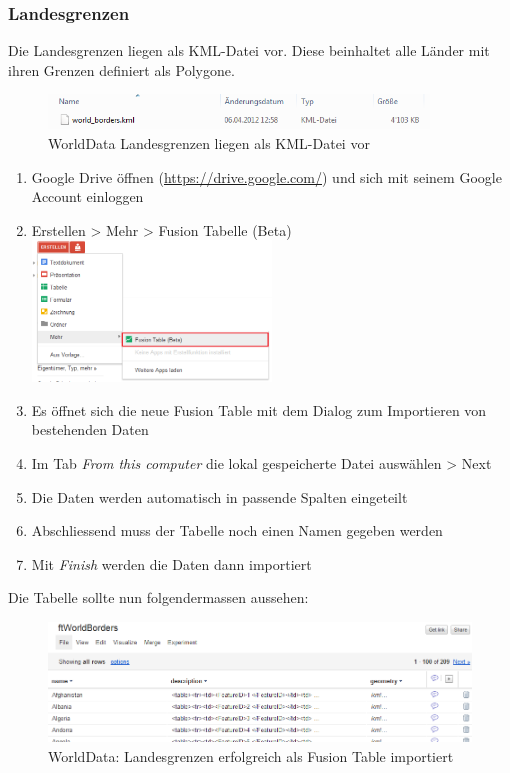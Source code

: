 \subsubsection{Landesgrenzen}
\label{landesgrenzen}
Die Landesgrenzen liegen als KML-Datei vor. Diese beinhaltet alle Länder mit ihren Grenzen definiert als Polygone.

\begin{figure}[!h]
	\centering
	\includegraphics[width=0.9\textwidth]{images/usecase1-worlddata/documentation/worlddata-worldborders_kml}
	\caption{WorldData Landesgrenzen liegen als KML-Datei vor}
	\label{worlddata-worldborders_kml}
\end{figure}

\begin{enumerate}
\item Google Drive öffnen (\url{https://drive.google.com/}) und sich mit seinem Google Account einloggen
\item Erstellen > Mehr > Fusion Tabelle (Beta) \\ \includegraphics[width=0.5\textwidth]{images/usecase1-worlddata/documentation/worlddata-worldborders_import1}
\item Es öffnet sich die neue Fusion Table mit dem Dialog zum Importieren von bestehenden Daten
\item Im Tab \emph{From this computer} die lokal gespeicherte Datei auswählen > Next
\item Die Daten werden automatisch in passende Spalten eingeteilt
\item Abschliessend muss der Tabelle noch einen Namen gegeben werden
\item Mit \emph{Finish} werden die Daten dann importiert
\end{enumerate}

Die Tabelle sollte nun folgendermassen aussehen:

\begin{figure}[H]
	\centering
	\includegraphics[width=\textwidth]{images/usecase1-worlddata/documentation/worlddata-worldborders_import_done}
	\caption{WorldData: Landesgrenzen erfolgreich als Fusion Table importiert}
	\label{worlddata-worldborders_import_done}
\end{figure}

